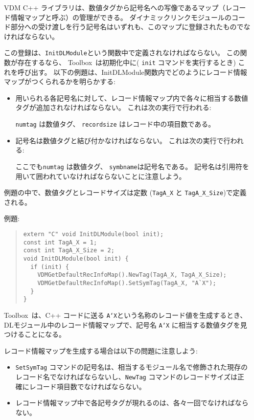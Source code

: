 \documentclass[\pformat,12pt]{jarticle}
\newcommand{\Toolbox}{Toolbox}
\begin{document}
VDM C++ ライブラリは、数値タグから記号名への写像であるマップ（レコード情報マップと呼ぶ）の管理ができる。
ダイナミックリンクモジュールのコード部分への受け渡しを行う記号名はいずれも、このマップに登録されたものでなければならない。

この登録は、{\tt InitDLModule}という関数中で定義されなければならない。 
この関数が存在するなら、 \Toolbox\ は初期化中に( {\tt init} コマンドを実行するとき) これを呼び出す。
以下の例題は、InitDLModule関数内でどのようにレコード情報マップがつくられるかを明らかする:
\begin{itemize}
\item 用いられる各記号名に対して、レコード情報マップ内で各々に相当する数値タグが追加されなければならない。
これは次の実行で行われる:

  \hspace*{1em}{\tt VDMGetDefaultRecInfoMap().NewTag(numtag, recordsize);}
  
 {\tt numtag} は数値タグ、 {\tt recordsize} はレコード中の項目数である。
\item 記号名は数値タグと結び付かなければならない。
これは次の実行で行われる:

  \hspace*{1em}{\tt VDMGetDefaultRecInfoMap().SetSymTag(numtag, "symbname"); }
  
ここでも{\tt numtag} は数値タグ、 {\tt symbname}は記号名である。
記号名は引用符を用いて囲われていなければならないことに注意しよう。
\end{itemize}


例題の中で、数値タグとレコードサイズは定数 ({\tt TagA\_X} と {\tt TagA\_X\_Size})で定義される。

例題:
\begin{quote}
\begin{verbatim}
extern "C" void InitDLModule(bool init); 
const int TagA_X = 1; 
const int TagA_X_Size = 2; 
void InitDLModule(bool init) {
  if (init) {
    VDMGetDefaultRecInfoMap().NewTag(TagA_X, TagA_X_Size);
    VDMGetDefaultRecInfoMap().SetSymTag(TagA_X, "A`X"); 
  }
}
\end{verbatim}
\end{quote}

 \Toolbox\ は、C++ コードに送る {\tt A`X}という名称のレコード値を生成するとき、DLモジュール中のレコード情報マップで、記号名 {\tt A`X} に相当する数値タグを見つけることになる。

レコード情報マップを生成する場合は以下の問題に注意しよう:
\begin{itemize}
\item  {\tt SetSymTag} コマンドの記号名は、相当するモジュール名で修飾された現存のレコード名でなければならないし、{\tt NewTag} コマンドのレコードサイズは正確にレコード項目数でなければならない。
\item レコード情報マップ中で各記号タグが現れるのは、各々一回でなければならない。
\end{itemize}
\end{document}
